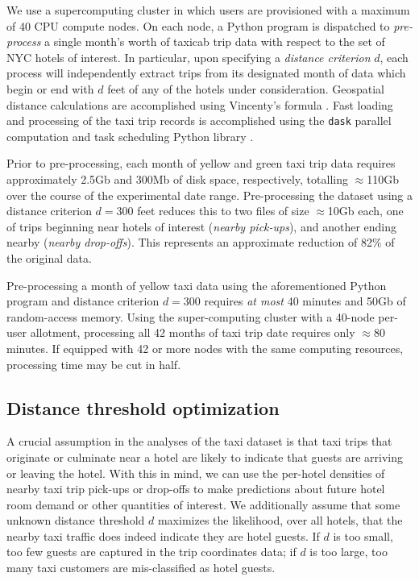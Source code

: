\documentclass[useAMS, usenatbib]{biom}
\begin{document}
We use a supercomputing cluster in which users are provisioned with a maximum of 40 CPU compute nodes. On each node, a Python program is dispatched to \textit{pre-process} a single month's worth of taxicab trip data with respect to the set of NYC hotels of interest. In particular, upon specifying a \textit{distance criterion} $d$, each process will independently extract trips from its designated month of data which begin or end with $d$ feet of any of the hotels under consideration. Geospatial distance calculations are accomplished using Vincenty's formula \citep{bessel_calculation_2010}. Fast loading and processing of the taxi trip records is accomplished using the \texttt{dask} parallel computation and task scheduling Python library \citep{dask}.

Prior to pre-processing, each month of yellow and green taxi trip data requires approximately 2.5Gb and 300Mb of disk space, respectively, totalling $\approx$110Gb over the course of the experimental date range. Pre-processing the dataset using a distance criterion $d = 300$ feet reduces this to two files of size $\approx$10Gb each, one of trips beginning near hotels of interest (\textit{nearby pick-ups}), and another ending nearby (\textit{nearby drop-offs}). This represents an approximate reduction of 82\% of the original data.

Pre-processing a month of yellow taxi data using the aforementioned Python program and distance criterion $d = 300$ requires \textit{at most} 40 minutes and 50Gb of random-access memory. Using the super-computing cluster with a 40-node per-user allotment, processing all 42 months of taxi trip date requires only $\approx$80 minutes. If equipped with 42 or more nodes with the same computing resources, processing time may be cut in half.

\subsection{Distance threshold optimization}
\label{ss:distance_opt}

A crucial assumption in the analyses of the taxi dataset is that taxi trips that originate or culminate near a hotel are likely to indicate that guests are arriving or leaving the hotel. With this in mind, we can use the per-hotel densities of nearby taxi trip pick-ups or drop-offs to make predictions about future hotel room demand or other quantities of interest. We additionally assume that some unknown distance threshold $d$ maximizes the likelihood, over all hotels, that the nearby taxi traffic does indeed indicate they are hotel guests. If $d$ is too small, too few guests are captured in the trip coordinates data; if $d$ is too large, too many taxi customers are mis-classified as hotel guests.
\end{document}
